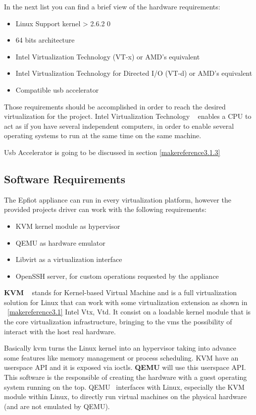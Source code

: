 In the next list you can find a brief view of the hardware requirements:

\begin{itemize}
    \item Linux Support kernel > 2.6.2  0
    \item 64 bits architecture
    \item Intel Virtualization Technology (VT-x) or AMD's equivalent
    \item Intel Virtualization Technology for Directed I/O (VT-d) or AMD's equivalent
    \item Compatible usb accelerator
\end{itemize}

Those requirements should be accomplished in order to reach the desired virtualization for the project.
Intel Virtualization Technology ~\cite{vtx} enables a CPU to act as if you have several independent computers, in order to enable several operating systems to run at the same time on the same machine.

Usb Accelerator is going to be discussed in section \ref{makereference3.1.3}

\subsection{Software Requirements}
\label{makereference3.1.2}

The Epfiot appliance can run in every virtualization platform, however the provided projects driver can work with the following requirements:

\begin{itemize}
    \item KVM kernel module as hypervisor
    \item QEMU as hardware emulator
    \item Libvirt as a virtualization interface
    \item OpenSSH server, for custom operations requested by the appliance
\end{itemize}

\textbf{KVM} ~\cite{kvm} stands for Kernel-based Virtual Machine and is a full virtualization solution for Linux that can work with some virtualization extension as shown in ~\ref{makereference3.1} Intel Vtx, Vtd. It consist on a loadable kernel module that is the core virtualization infrastructure, bringing to the vms the possibility of interact with the host real hardware.

Basically kvm turns the Linux kernel into an hypervisor taking into advance some features like memory management or process scheduling. KVM have an userspace API and it is exposed via ioctls.
\textbf{QEMU} will use this userspace API. This software is the responsible of creating the hardware with a guest operating system running on the top. QEMU ~\cite{virtualization}interfaces with Linux, especially the KVM module within Linux, to directly run virtual machines on the physical hardware (and are not emulated by QEMU).

